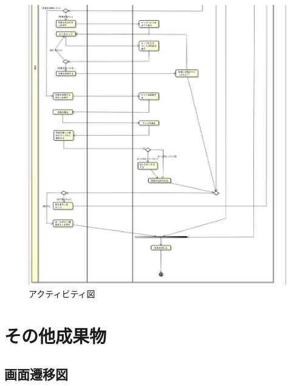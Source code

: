 \documentclass[openany,11pt,papersize]{jsbook}
\begin{document}
\begin{appendix}
       \begin{figure}{}
        \begin{center}
\includegraphics[width=20cm, bb=0 0 1880 2041]{project_activity2.2-2.png}
        \end{center}
                 \caption{アクティビティ図}
 \label{fig:one}
      \end{figure}
      
\chapter{その他成果物}  
\section{画面遷移図}




\end{appendix}
\end{document}
